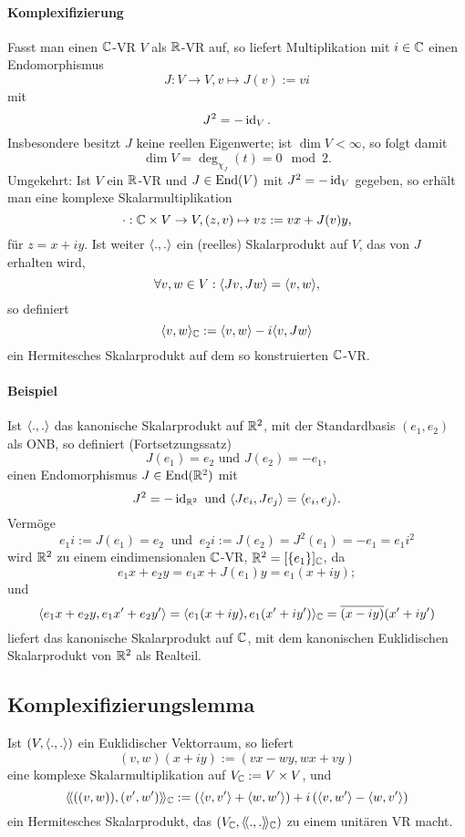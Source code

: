 \paragraph{Komplexifizierung}
	Fasst man einen $ \mathbb{C} $-VR $ V $ als $ \mathbb{R} $-VR auf, so liefert Multiplikation mit $ i\in \mathbb{C} $ einen Endomorphismus
		\[ J:V\to V, v\mapsto J(v):= vi \] %
	mit
		\[ J^2 = -\operatorname{id}_V. \]
	Insbesondere besitzt $ J $ keine reellen Eigenwerte;
	ist $ \dim V < \infty $, so folgt damit
		\[ \dim V = \deg_{\chi_J}(t) = 0 \mod 2. \]
	Umgekehrt: Ist $ V $ ein $ \mathbb{R} $-VR und $ J\in \operatorname{End}(V) $ mit $ J^2 = -\operatorname{id}_V $ gegeben, so erhält man eine komplexe Skalarmultiplikation
		\[ \cdot :\mathbb{C}\times V \to V, (z,v)\mapsto vz := vx+J(v)y, \]
	für $ z = x+iy $.
	Ist weiter $ \langle .,. \rangle $ ein (reelles) Skalarprodukt auf $ V $, das von $ J $ erhalten wird, 
		\[ \forall v,w\in V: \langle Jv,Jw \rangle = \langle v,w \rangle, \]
	so definiert
		\[ \langle v,w \rangle_{\mathbb{C}} := \langle v,w \rangle -i \langle v,Jw \rangle \]
	ein Hermitesches Skalarprodukt auf dem so konstruierten $ \mathbb{C} $-VR.

\paragraph{Beispiel}\label{JDrehung}
	Ist $ \langle .,. \rangle $ das kanonische Skalarprodukt auf $ \mathbb{R}^2 $, mit der Standardbasis $ (e_1,e_2) $ als ONB, so definiert (Fortsetzungssatz)
		\[ J(e_1) = e_2 \text{ und } J(e_2) = -e_1, \]
	einen Endomorphismus $ J\in\operatorname{End}(\mathbb{R}^2) $ mit
		\[ J^2 = -\operatorname{id}_{\mathbb{R}^2} \text{ und } \langle Je_i,Je_j \rangle = \langle e_i,e_j \rangle. \]
	Vermöge
		\[ e_1i := J(e_1) = e_2\ \text{ und }\ e_2i := J(e_2) = J^2(e_1) = -e_1 = e_1 i^2 \]
	wird $ \mathbb{R}^2 $ zu einem eindimensionalen $ \mathbb{C} $-VR, $ \mathbb{R}^2 = [\{e_1\}]_{\mathbb{C}} $, da
		\[ e_1x+e_2y = e_1x+J(e_1)y = e_1 (x+iy); \]
	und
		\[ \langle e_1x+e_2y,e_1x'+e_2y' \rangle = \langle e_1(x+iy),e_1(x'+iy') \rangle_{\mathbb{C}} = \overline{(x-iy)}(x'+iy') \]
	liefert das kanonische Skalarprodukt auf $ \mathbb{C} $, mit dem kanonischen Euklidischen Skalarprodukt von $ \mathbb{R}^2 $ als Realteil.

\subsection{Komplexifizierungslemma}
\begin{Lemma}[Komplexifizierungslemma]
	Ist $ (V,\langle .,. \rangle) $ ein Euklidischer Vektorraum, so liefert
		\[ (v,w)(x+iy) := (vx-wy,wx+vy) \]
	eine komplexe Skalarmultiplikation auf $ V_{\mathbb{C}} := V\times V $, und
		\[ \langle\! \langle ((v,w)),(v',w') \rangle\! \rangle_{\mathbb{C}} := \left(\langle v,v' \rangle+\langle w,w' \rangle \right)+i\left(\langle v,w' \rangle-\langle w,v' \rangle \right) \]
	ein Hermitesches Skalarprodukt, das $ (V_{\mathbb{C}},\langle\! \langle .,. \rangle\! \rangle_{\mathbb{C}}) $ zu einem unitären VR macht.
\end{Lemma}

